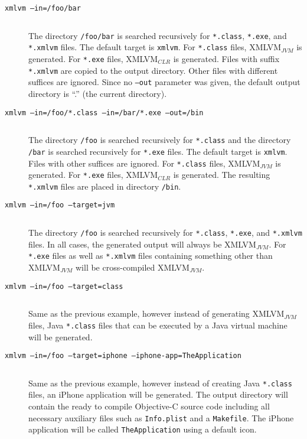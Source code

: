 \documentclass[12pt]{article}
\begin{document}
\begin{description}

\item[\texttt{xmlvm --in=/foo/bar}] $ $

  The directory \texttt{/foo/bar} is searched recursively for
  \texttt{*.class}, \texttt{*.exe}, and \texttt{*.xmlvm} files. The
  default target is \texttt{xmlvm}. For \texttt{*.class} files,
  XMLVM$_{JVM}$ is generated. For \texttt{*.exe} files, XMLVM$_{CLR}$
  is generated. Files with suffix \texttt{*.xmlvm} are copied to the
  output directory. Other files with different suffices are ignored.
  Since no \texttt{--out} parameter was given, the default output
  directory is ``.'' (the current directory).

\item[\texttt{xmlvm --in=/foo/*.class --in=/bar/*.exe --out=/bin}] $ $

  The directory \texttt{/foo} is searched recursively for
  \texttt{*.class} and the directory \texttt{/bar} is searched
  recursively for \texttt{*.exe} files. The default target is
  \texttt{xmlvm}. Files with other suffices are ignored. For
  \texttt{*.class} files, XMLVM$_{JVM}$ is generated. For
  \texttt{*.exe} files, XMLVM$_{CLR}$ is generated. The resulting
  \texttt{*.xmlvm} files are placed in directory \texttt{/bin}.

\item[\texttt{xmlvm --in=/foo --target=jvm}] $ $

  The directory \texttt{/foo} is searched recursively for
  \texttt{*.class}, \texttt{*.exe}, and \texttt{*.xmlvm} files. In all
  cases, the generated output will always be XMLVM$_{JVM}$. For
  \texttt{*.exe} files as well as \texttt{*.xmlvm} files containing
  something other than XMLVM$_{JVM}$ will be cross-compiled
  XMLVM$_{JVM}$.

\item[\texttt{xmlvm --in=/foo --target=class}] $ $

  Same as the previous example, however instead of generating
  XMLVM$_{JVM}$ files, Java \texttt{*.class} files that can be
  executed by a Java virtual machine will be generated.

\item[\texttt{xmlvm --in=/foo --target=iphone --iphone-app=TheApplication}] $ $

  Same as the previous example, however instead of creating Java
  \texttt{*.class} files, an iPhone application will be generated.
  The output directory will contain the ready to compile Objective-C
  source code including all necessary auxiliary files such as
  \texttt{Info.plist} and a \texttt{Makefile}. The iPhone application
  will be called \texttt{TheApplication} using a default icon.


\end{description}
\end{document}
